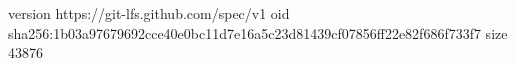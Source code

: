 version https://git-lfs.github.com/spec/v1
oid sha256:1b03a97679692cce40e0bc11d7e16a5c23d81439cf07856ff22e82f686f733f7
size 43876
